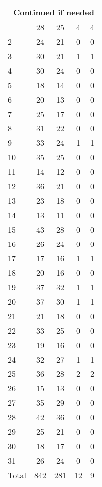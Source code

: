 \begin{center}
\begin{longtable}{l|c|c|c|c}
\hline \multicolumn{5}{|r|}{{Continued if needed}} \\ \hline
\endfoot 
1 & 28 & 25 & 4 & 4\\ \hline
2 & 24 & 21 & 0 & 0\\ \hline
3 & 30 & 21 & 1 & 1\\ \hline
4 & 30 & 24 & 0 & 0\\ \hline
5 & 18 & 14 & 0 & 0\\ \hline
6 & 20 & 13 & 0 & 0\\ \hline
7 & 25 & 17 & 0 & 0\\ \hline
8 & 31 & 22 & 0 & 0\\ \hline
9 & 33 & 24 & 1 & 1\\ \hline
10 & 35 & 25 & 0 & 0\\ \hline
11 & 14 & 12 & 0 & 0\\ \hline
12 & 36 & 21 & 0 & 0\\ \hline
13 & 23 & 18 & 0 & 0\\ \hline
14 & 13 & 11 & 0 & 0\\ \hline
15 & 43 & 28 & 0 & 0\\ \hline
16 & 26 & 24 & 0 & 0\\ \hline
17 & 17 & 16 & 1 & 1\\ \hline
18 & 20 & 16 & 0 & 0\\ \hline
19 & 37 & 32 & 1 & 1\\ \hline
20 & 37 & 30 & 1 & 1\\ \hline
21 & 21 & 18 & 0 & 0\\ \hline
22 & 33 & 25 & 0 & 0\\ \hline
23 & 19 & 16 & 0 & 0\\ \hline
24 & 32 & 27 & 1 & 1\\ \hline
25 & 36 & 28 & 2 & 2\\ \hline
26 & 15 & 13 & 0 & 0\\ \hline
27 & 35 & 29 & 0 & 0\\ \hline
28 & 42 & 36 & 0 & 0\\ \hline
29 & 25 & 21 & 0 & 0\\ \hline
30 & 18 & 17 & 0 & 0\\ \hline
31 & 26 & 24 & 0 & 0\\ \hline
\hline \hline
Total & 842 & 281 & 12 & 9



\end{longtable}
\end{center}

 
